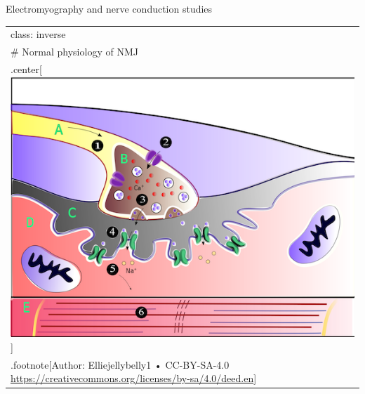 \documentclass[
  ignorenonframetext,
]{beamer}
\begin{document}
\begin{frame}{Electromyography and nerve conduction studies}
\begin{longtable}[]{@{}
  >{\raggedright\arraybackslash}p{}@{}}
\toprule
\endhead
class: inverse \\
\# Normal physiology of NMJ \\
.center{[}\includegraphics{nmj.png}{]} \\
.footnote{[}Author: Elliejellybelly1 • CC-BY-SA-4.0
\url{https://creativecommons.org/licenses/by-sa/4.0/deed.en}{]} \\
\bottomrule
\end{longtable}
\end{frame}
\end{document}
